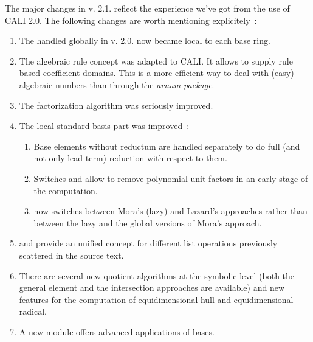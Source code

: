 The major changes in v. 2.1. reflect the experience we've got from the
use of CALI 2.0. The following changes are worth mentioning
explicitely~:
\begin{enumerate}
\item The  handled globally in v. 2.0. now became local to
each base ring.

\item The algebraic rule concept was adapted to CALI. It allows to
supply rule based coefficient domains. This is a more efficient way
to deal with (easy) algebraic numbers than through the {\em arnum
package}.

\item The \gr factorization algorithm was seriously improved.

\item The local standard basis part was improved~:
        \begin{enumerate}
        
        \item Base elements without reductum are handled separately
        to do full (and not only lead term) reduction with respect to
        them.
        
        \item Switches  and  allow
        to remove polynomial unit factors in an early stage of the
        computation.

        \item {} now switches between Mora's (lazy) and
        Lazard's approaches rather than between the lazy and the
        global versions of Mora's approach.
        \end{enumerate}

\item {} and  provide an unified
concept for different list operations previously scattered in the
source text.

\item There are several new quotient algorithms at the symbolic level
(both the general element and the intersection approaches are
available) and new features for the computation of equidimensional
hull and equidimensional radical.

\item A new module  offers advanced applications of \gr
bases.


\end{enumerate}
